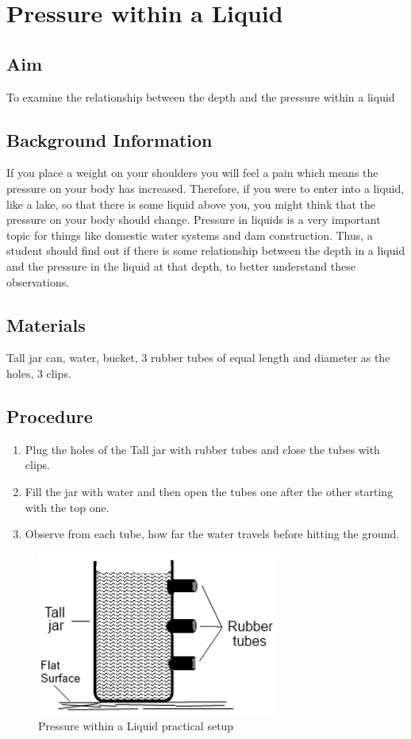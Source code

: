\chapter{Pressure within a Liquid}

\section{Aim}
To examine the relationship between the depth and the pressure within a liquid

\section{Background Information}
If you place a weight on your shoulders you will feel a pain which means the pressure on your body has increased. Therefore, if you were to enter into a liquid, like a lake, so that there is some liquid above you, you might think that the pressure on your body should change. Pressure in liquids is a very important topic for things like domestic water systems and dam construction. Thus, a student should find out if there is some relationship between the depth in a liquid and the pressure in the liquid at that depth, to better understand these observations. 

\section{Materials}
Tall jar can, water, bucket, 3 rubber tubes of equal length and diameter as the holes, 3 clips.

\section{Procedure}
\begin{enumerate}
\item Plug the holes of the Tall jar with rubber tubes and close the tubes with clips.
\item Fill the jar with water and then open the tubes one after the other starting with the top one.
\item Observe from each tube, how far the water travels before hitting the ground. 
\end{enumerate}

\begin{figure}[h!]
\centering
\includegraphics[width=8cm]{./img/pressure-liquid-1.png}
\caption{Pressure within a Liquid practical setup}
\label{fig:pressure-liquid-1}
\end{figure}

